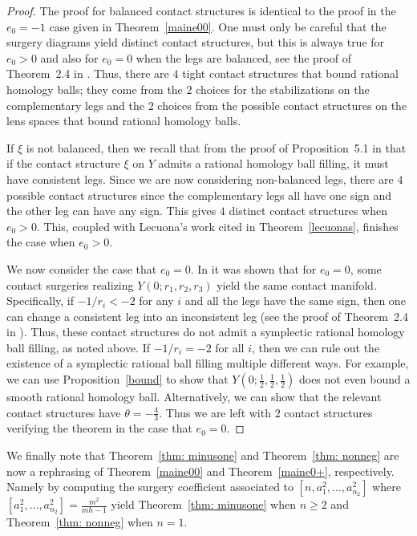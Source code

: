 \documentclass[11pt]{amsart}
\theoremstyle{plain}
\theoremstyle{definition}
\theoremstyle{remark}
\numberwithin{theorem}{section}
\begin{document}
\begin{proof}
The proof for balanced contact structures is identical to the proof in the $e_0=-1$ case given in Theorem~\ref{maine00}. One must only be careful that the surgery diagrams yield distinct contact structures, but this is always true for $e_0>0$ and also for $e_0=0$ when the legs are balanced, see the proof of Theorem~2.4 in \cite{GhigginiLiscaStipsicz06}. Thus, there are $4$ tight contact structures that bound rational homology balls; they come from the $2$ choices for the stabilizations on the complementary legs and the $2$ choices from the possible contact structures on the lens spaces that bound rational homology balls. 

If $\xi$ is not balanced, then we recall that from the proof of Proposition~5.1 in \cite{EtnyreOzbagciTosun2025} that if the contact structure $\xi$ on $Y$ admits a rational homology ball filling, it must have consistent legs. Since we are now considering non-balanced legs, there are $4$ possible contact structures since the complementary legs all have one sign and the other leg can have any sign. This gives $4$ distinct contact structures when $e_0>0$. This, coupled with Lecuona's work cited in Theorem~\ref{lecuonas}, finishes the case when $e_0>0$. 

We now consider the case that $e_0=0$. In \cite{GhigginiLiscaStipsicz06} it was shown that for $e_0=0$, some contact surgeries realizing $Y(0;r_1,r_2, r_3)$ yield the same contact manifold. Specifically, if $-1/r_i<-2$ for any $i$ and all the legs have the same sign, then one can change a consistent leg into an inconsistent leg (see the proof of Theorem~2.4 in \cite{GhigginiLiscaStipsicz06}). Thus, these contact structures do not admit a symplectic rational homology ball filling, as noted above. If $-1/r_i=-2$ for all $i$, then we can rule out the existence of a symplectic rational ball filling multiple different ways. For example, we can use Proposition~\ref{bound} to show that $Y(0;\frac{1}{2}, \frac{1}{2}, \frac{1}{2})$ does not even bound a smooth rational homology ball. Alternatively, we can show that the relevant contact structures have $\theta=-\frac{4}{3}$. Thus we are left with $2$ contact structures verifying the theorem in the case that $e_0=0$. 
\end{proof}

We finally note that Theorem~\ref{thm: minusone} and Theorem~\ref{thm: nonneg} are now a rephrasing of Theorem~\ref{maine00} and Theorem~\ref{maine0+}, respectively. Namely by computing the surgery coefficient associated to $[n,a^2_1,\ldots, a^2_{n_2}]$ where $[a^2_1,\ldots, a^2_{n_2}]=\frac{m^2}{mh-1}$ yield Theorem~\ref{thm: minusone} when $n\geq 2$ and Theorem~\ref{thm: nonneg} when $n=1$. 
\end{document}
